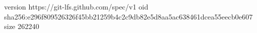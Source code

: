 version https://git-lfs.github.com/spec/v1
oid sha256:e296f809526326f45bb21259b4c2c9db82e5d8aa5ac638461dcea55eecb0e607
size 262240
